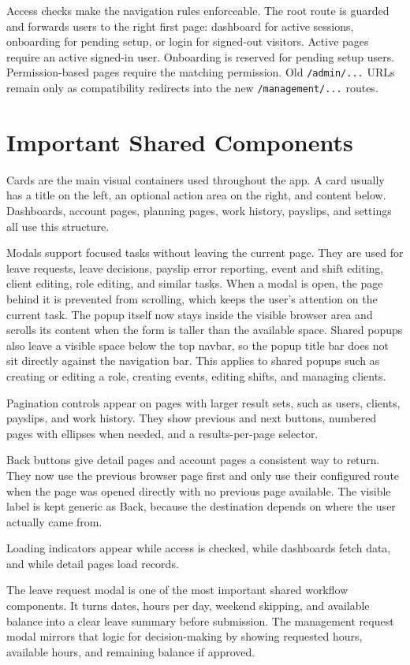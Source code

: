 \documentclass[11pt]{article}
\newcommand{\code}[1]{\nolinkurl{#1}}
\begin{document}
Access checks make the navigation rules enforceable. The root route is guarded and forwards users to the right first page: dashboard for active sessions, onboarding for pending setup, or login for signed-out visitors. Active pages require an active signed-in user. Onboarding is reserved for pending setup users. Permission-based pages require the matching permission. Old \code{/admin/...} URLs remain only as compatibility redirects into the new \code{/management/...} routes.
\section{Important Shared Components}

Cards are the main visual containers used throughout the app. A card usually has a title on the left, an optional action area on the right, and content below. Dashboards, account pages, planning pages, work history, payslips, and settings all use this structure.

Modals support focused tasks without leaving the current page. They are used for leave requests, leave decisions, payslip error reporting, event and shift editing, client editing, role editing, and similar tasks. When a modal is open, the page behind it is prevented from scrolling, which keeps the user's attention on the current task. The popup itself now stays inside the visible browser area and scrolls its content when the form is taller than the available space. Shared popups also leave a visible space below the top navbar, so the popup title bar does not sit directly against the navigation bar. This applies to shared popups such as creating or editing a role, creating events, editing shifts, and managing clients.

Pagination controls appear on pages with larger result sets, such as users, clients, payslips, and work history. They show previous and next buttons, numbered pages with ellipses when needed, and a results-per-page selector.

Back buttons give detail pages and account pages a consistent way to return. They now use the previous browser page first and only use their configured route when the page was opened directly with no previous page available. The visible label is kept generic as Back, because the destination depends on where the user actually came from.

Loading indicators appear while access is checked, while dashboards fetch data, and while detail pages load records.

The leave request modal is one of the most important shared workflow components. It turns dates, hours per day, weekend skipping, and available balance into a clear leave summary before submission. The management request modal mirrors that logic for decision-making by showing requested hours, available hours, and remaining balance if approved.
\end{document}
